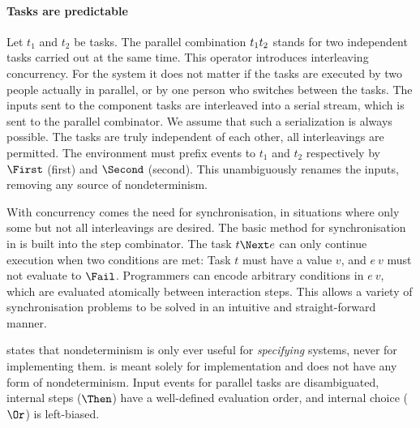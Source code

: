 \paragraph{Tasks are predictable}

Let $t_1$ and $t_2$ be tasks.
The parallel combination $t_1 \relax t_2$ stands for two independent tasks carried out at the same time.
This operator introduces interleaving concurrency.
For the system it does not matter if the tasks are executed by two people actually in parallel, or by one person who switches between the tasks.
The inputs sent to the component tasks are interleaved into a serial stream, which is sent to the parallel combinator.
We assume that such a serialization is always possible.
The tasks are truly independent of each other, all interleavings are permitted.
The environment must prefix events to $t_1$ and $t_2$ respectively by $\First$ (first) and $\Second$ (second).
This unambiguously renames the inputs, removing any source of nondeterminism.

With concurrency comes the need for synchronisation, in situations where only some but not all interleavings are desired.
The basic method for synchronisation in \TOPHAT is built into the step combinator.
The task $t \Next e$ can only continue execution when two conditions are met:
Task $t$ must have a value $v$, and $e\ v$ must not evaluate to $\Fail$.
Programmers can encode arbitrary conditions in $e\ v$, which are evaluated atomically between interaction steps.
This allows a variety of synchronisation problems to be solved in an intuitive and straight-forward manner.

 states that nondeterminism is only ever useful for \emph{specifying} systems, never for implementing them.
\TOPHAT is meant solely for implementation and does not have any form of nondeterminism.
Input events for parallel tasks are disambiguated, internal steps ($\Then$) have a well-defined evaluation order, and internal choice ($\Or$) is left-biased.

%
%
%
%
%


